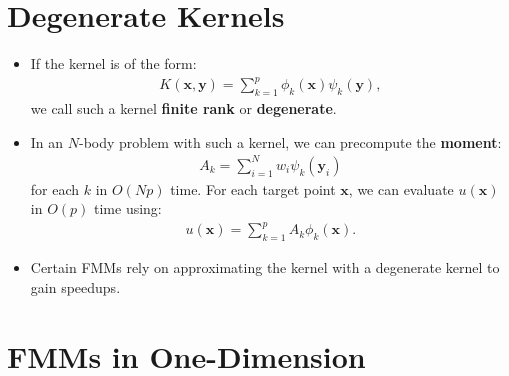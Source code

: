 \documentclass[10pt]{article}
\newcommand{\ve}[1]{\mathbf{#1}}
\begin{document}

\section{Degenerate Kernels}\label{sec:degenerate_kernels} %

\begin{itemize}
  \item If the kernel is of the form:
  \begin{align*}
    K(\ve{x}, \ve{y}) = \sum_{k=1}^p \phi_k(\ve{x}) \psi_k(\ve{y}),
  \end{align*}
  we call such a kernel \textbf{finite rank} or \textbf{degenerate}.
  
  \item In an $N$-body problem with such a kernel, we can precompute the \textbf{moment}:
  \begin{align*}
    A_k = \sum_{i=1}^N w_i \psi_k(\ve{y}_i)
  \end{align*}
  for each $k$ in $O(Np)$ time. For each target point $\ve{x}$, we can evaluate $u(\ve{x})$ in $O(p)$ time using:
  \begin{align*}
    u(\ve{x}) = \sum_{k=1}^p A_k \phi_k(\ve{x}).
  \end{align*}
  
  \item Certain FMMs rely on approximating the kernel with a degenerate kernel to gain speedups.
\end{itemize}


\section{FMMs in One-Dimension}\label{sec:fmms_in_one_dimension} %
\end{document}

